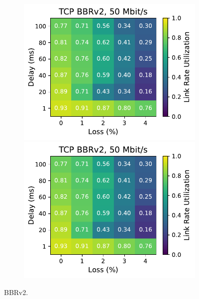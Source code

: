 \begin{figure}[ht]
\begin{subfigure}[b]{0.89cm}
        \includegraphics[width=\linewidth,trim={8cm 0 0 0},clip]{splitting/figures/heatmaps/heatmap_tcp_bbr2_50mbps.pdf}
        \includegraphics[width=\linewidth,trim={8cm 0 0 0},clip]{splitting/figures/heatmaps/heatmap_tcp_bbr2_50mbps.pdf}
        \vspace*{0.2cm}
    \end{subfigure}
    \caption{BBRv2.}
\end{figure}

